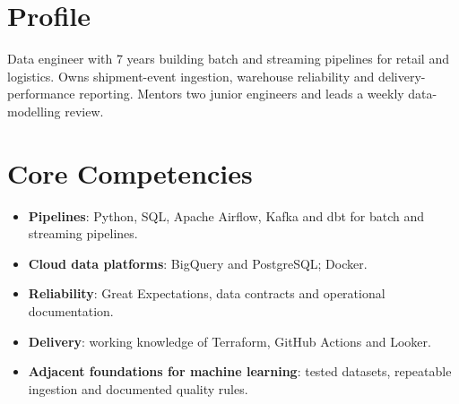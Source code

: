 \documentclass[11pt,a4paper,sans]{moderncv}
\begin{document}
\makecvtitle

\section{Profile}
Data engineer with 7 years building batch and streaming pipelines for retail and logistics. Owns shipment-event ingestion, warehouse reliability and delivery-performance reporting. Mentors two junior engineers and leads a weekly data-modelling review.

\section{Core Competencies}
\begin{itemize}
  \item \textbf{Pipelines}: Python, SQL, Apache Airflow, Kafka and dbt for batch and streaming pipelines.
  \item \textbf{Cloud data platforms}: BigQuery and PostgreSQL; Docker.
  \item \textbf{Reliability}: Great Expectations, data contracts and operational documentation.
  \item \textbf{Delivery}: working knowledge of Terraform, GitHub Actions and Looker.
  \item \textbf{Adjacent foundations for machine learning}: tested datasets, repeatable ingestion and documented quality rules.
\end{itemize}
\end{document}
